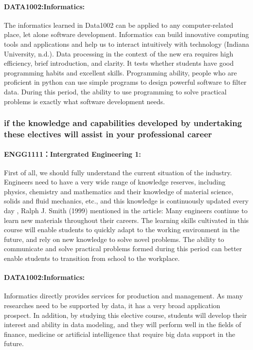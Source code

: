 \documentclass[../draft.tex]{subfiles}
\begin{document}
\paragraph{DATA1002:Informatics:}
The informatics learned in Data1002 can be applied to any computer-related place, let alone software development. Informatics can build innovative computing tools and applications and help us to interact intuitively with technology (Indiana University, n.d.). Data processing in the context of the new era requires high efficiency, brief introduction, and clarity. It tests whether students have good programming habits and excellent skills. Programming ability, people who are proficient in python can use simple programs to design powerful software to filter data. During this period, the ability to use programming to solve practical problems is exactly what software development needs.
\subsubsection{if the knowledge and capabilities developed by undertaking these electives will assist in your professional career}
\paragraph{ENGG1111：Intergrated Engineering 1:} 
First of all, we should fully understand the current situation of the industry. Engineers need to have a very wide range of knowledge reserves, including physics, chemistry and mathematics and their knowledge of material science, solids and fluid mechanics, etc., and this knowledge is continuously updated every day , Ralph J. Smith (1999) mentioned in the article: Many engineers continue to learn new materials throughout their careers. The learning skills cultivated in this course will enable students to quickly adapt to the working environment in the future, and rely on new knowledge to solve novel problems. The ability to communicate and solve practical problems formed during this period can better enable students to transition from school to the workplace.
\paragraph{DATA1002:Informatics:}
Informatics directly provides services for production and management. As many researches need to be supported by data, it has a very broad application prospect. In addition, by studying this elective course, students will develop their interest and ability in data modeling, and they will perform well in the fields of finance, medicine or artificial intelligence that require big data support in the future.
\end{document}
